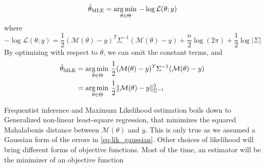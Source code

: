 \documentclass[../../Main_ManuscritThese.tex]{subfiles}
\begin{document}
  \begin{equation}
    \hat{\theta}_{\mathrm{MLE}} = \operatorname*{arg\,min \,}_{\theta \in \Theta} -\log \mathcal{L}(\theta;y)
  \end{equation}
  where
  \begin{equation}
    -\log\mathcal{L}(\theta;y) = \frac{1}{2}(\mathcal{M}(\theta) - y)^T\Sigma^{-1}(\mathcal{M}(\theta) - y)+  \frac{n}{2}\log(2\pi) + \frac{1}{2}\log\lvert \Sigma \rvert
  \end{equation}
  By optimizing with respect to $\theta$, we can omit the constant terms, and
  \begin{align*}
    \hat{\theta}_{\mathrm{MLE}} &= \operatorname*{arg\,min \,}_{\theta \in \Theta}\frac{1}{2}(\mathcal{M}(\theta) - y)^T\Sigma^{-1}(\mathcal{M}(\theta) - y)\\ &= \operatorname*{arg\,min \,}_{\theta \in \Theta}\frac12 \| \mathcal{M}(\theta) - y \|^2_{\Sigma^{-1}}
  \end{align*}

  Frequentist inference and Maximum Likelihood estimation boils down to Generalized non-linear least-square regression, that minimizes the squared Mahalabonis distance between $\mathcal{M}({\theta})$ and $y$. This is only true as we assumed a Gaussian form of the errors in \cref{eq:lik_gaussian}. Other choices of likelihood will bring different forms of objective functions. 
Most of the time, an estimator will be the minimizer of an objective function
\end{document}

